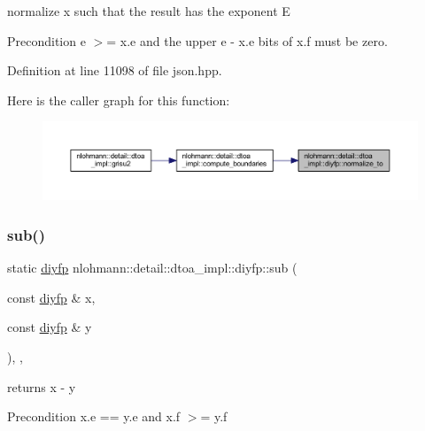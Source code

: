 normalize x such that the result has the exponent E 

\begin{DoxyPrecond}{Precondition}
e $>$= x.\+e and the upper e -\/ x.\+e bits of x.\+f must be zero. 
\end{DoxyPrecond}


Definition at line 11098 of file json.\+hpp.

Here is the caller graph for this function\+:
\nopagebreak
\begin{figure}[H]
\begin{center}
\leavevmode
\includegraphics[width=350pt]{structnlohmann_1_1detail_1_1dtoa__impl_1_1diyfp_a6b6665e467ebabe0c0f7418d3fe4b118_icgraph}
\end{center}
\end{figure}
\mbox{\label{structnlohmann_1_1detail_1_1dtoa__impl_1_1diyfp_aeb26771af54ad73598c1a0430d65d884}} 
\subsubsection{\texorpdfstring{sub()}{sub()}}
{\footnotesize\ttfamily static \mbox{\hyperlink{structnlohmann_1_1detail_1_1dtoa__impl_1_1diyfp}{diyfp}} nlohmann\+::detail\+::dtoa\+\_\+impl\+::diyfp\+::sub (\begin{DoxyParamCaption}\item[{const \mbox{\hyperlink{structnlohmann_1_1detail_1_1dtoa__impl_1_1diyfp}{diyfp}} \&}]{x,  }\item[{const \mbox{\hyperlink{structnlohmann_1_1detail_1_1dtoa__impl_1_1diyfp}{diyfp}} \&}]{y }\end{DoxyParamCaption})\hspace{0.3cm}{\ttfamily [inline]}, {\ttfamily [static]}, {\ttfamily [noexcept]}}



returns x -\/ y 

\begin{DoxyPrecond}{Precondition}
x.\+e == y.\+e and x.\+f $>$= y.\+f 
\end{DoxyPrecond}


